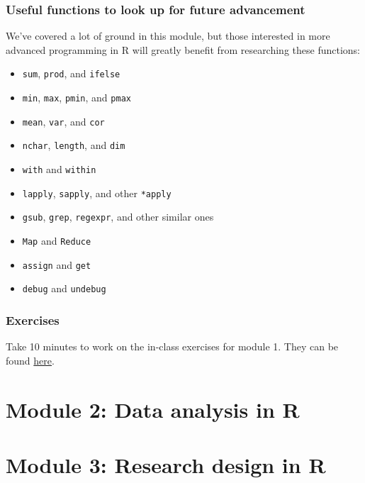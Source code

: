 \documentclass{beamer}
\begin{document}
\begin{frame}
    \frametitle{Useful functions to look up for future advancement}
    We've covered a lot of ground in this module,
    but those interested in more advanced programming in R
    will greatly benefit from researching these functions:\\
    
    \begin{itemize}
      \item \texttt{sum}, \texttt{prod}, and \texttt{ifelse}
      \item \texttt{min}, \texttt{max}, \texttt{pmin}, and \texttt{pmax}
      \item \texttt{mean}, \texttt{var}, and \texttt{cor}
      \item \texttt{nchar}, \texttt{length}, and \texttt{dim}
      \item \texttt{with} and \texttt{within}
      \item \texttt{lapply}, \texttt{sapply}, and other \texttt{*apply}
      \item \texttt{gsub}, \texttt{grep}, \texttt{regexpr}, and other similar ones 
      \item \texttt{Map} and \texttt{Reduce}
      \item \texttt{assign} and \texttt{get}
      \item \texttt{debug} and \texttt{undebug}
    \end{itemize}
\end{frame}


\begin{frame}
    \frametitle{Exercises}
    Take 10 minutes to work on the in-class exercises for module 1.
    They can be found \href{https://github.com/rnitulescu/RcourseOncology2020/blob/master/exercises1.R}{here}.
\end{frame}



\section{Module 2: Data analysis in R}




\section{Module 3: Research design in R}




\end{document}
